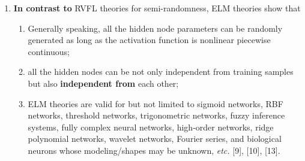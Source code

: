 \documentclass[onecolumn,conference]{IEEEtran}
\begin{document}
\begin{enumerate}
\item \textbf{In contrast to} RVFL theories for semi-randomness, ELM theories show that 
\begin{enumerate}
\item Generally speaking, all the hidden node parameters can be randomly generated as long as the activation function is nonlinear piecewise continuous; 
\item all the hidden nodes can be not only independent from training samples but also \textbf{independent from} each other; 
\item ELM theories are valid for but not limited to sigmoid networks, RBF networks, threshold networks, trigonometric networks, fuzzy inference systems, fully complex neural networks, high-order networks, ridge polynomial networks, wavelet networks, Fourier series, and biological neurons whose modeling/shapes may be unknown, \emph{etc.} [9], [10], [13].
\end{enumerate}
 \cite{Huang2015}
\end{enumerate}


\end{document}
